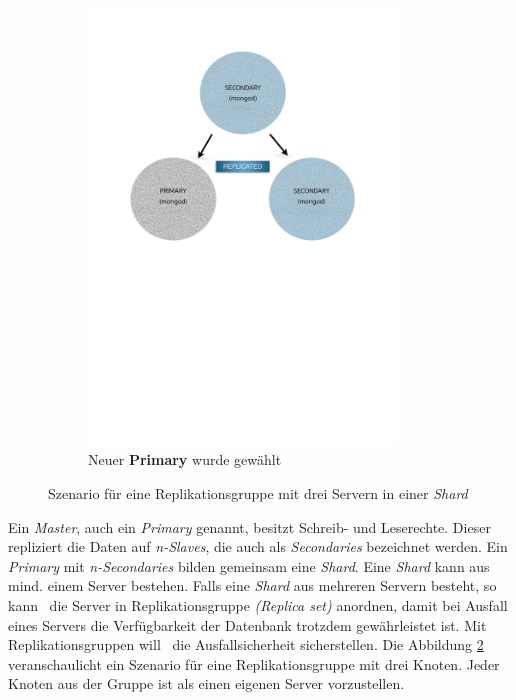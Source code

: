 \begin{figure}[H]
\begin{subfigure}[t]{0.49\textwidth}
        \includegraphics[trim = 28mm 139mm 28mm 29mm, clip, width=0.9\textwidth]{resources/replicaSet/newReplicaSet}
      \caption[Neuer \textbf{Primary} wurde gewählt]{Neuer \textbf{Primary} wurde gewählt}
      \label{img:newReplicaSet}
   \end{subfigure}
   \caption{Szenario für eine Replikationsgruppe mit drei Servern in einer \textit{Shard}}
   \label{img:replicaSetSzenario}
\end{figure}
Ein \textit{Master}, auch ein \textit{Primary} genannt, besitzt Schreib- und Leserechte. Dieser repliziert die Daten auf \textit{n-Slaves}, die auch als \textit{Secondaries} bezeichnet werden. Ein \textit{Primary} mit \textit{n-Secondaries} bilden gemeinsam eine \textit{Shard}. Eine \textit{Shard} kann aus mind. einem Server bestehen. Falls eine \textit{Shard} aus mehreren Servern besteht, so kann \mongo\ die Server in Replikationsgruppe \textit{(Replica set)} anordnen, damit bei Ausfall eines Servers die Verfügbarkeit der Datenbank trotzdem gewährleistet ist. Mit Replikationsgruppen will \mongo\ die Ausfallsicherheit sicherstellen. Die Abbildung \ref{img:replicaSetSzenario} veranschaulicht ein Szenario für eine Replikationsgruppe mit drei Knoten. Jeder Knoten aus der Gruppe ist als einen eigenen Server vorzustellen. %
